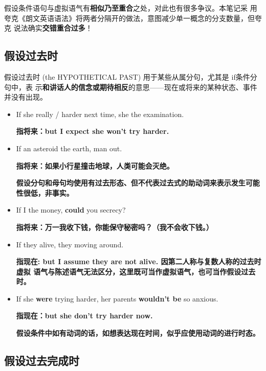 假设条件语句与虚拟语气有\textbf{相似乃至重合}之处，对此也有很多争议。本笔记采
用夸克《朗文英语语法》将两者分隔开的做法，意图减少单一概念的分支数量，但夸克
说法确实\textbf{交错重合过多}！


\subsection{假设过去时}

假设过去时 (the HYPOTHETICAL PAST) 用于某些从属分句，尤其是 if条件分句中，表
示\textbf{和讲话人的信念或期待相反}的意思——现在或将来的某种状态、事件并没有出现。

\begin{itemize}
\item If she really  /  harder next time, she  the examination.

  \textbf{指将来：but I expect she won't try harder.}

\item If an asteroid  the earth, man  out.

  \textbf{指将来：如果小行星撞击地球，人类可能会灭绝。}

  \textbf{假设分句和母句均使用有过去形态、但不代表过去式的助动词来表示发生可能性很低，非事实。}

\item If I  the money, \textbf{could} you  secrecy?

  \textbf{指将来：万一我收下钱，你能保守秘密吗？（我不会收下钱。）}

\item If they  alive, they  moving around.

  \textbf{指现在: but I assume they are not alive. 因第二人称与复数人称的过去时虚拟
    语气与陈述语气无法区分，这里既可当作虚拟语气，也可当作假设过去时。}

\item If she \textbf{were} trying harder, her parents \textbf{wouldn't be} so anxious.

  \textbf{指现在：but she don't try harder now.}

  \textbf{假设条件中如有动词的话，如想表达现在时间，似乎应使用动词的进行时态。}

\end{itemize}


\subsection{假设过去完成时}

